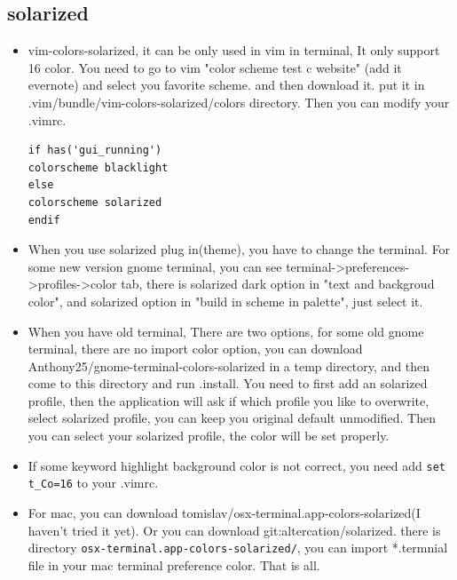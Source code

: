 \documentclass[a4paper,12pt,twoside]{book}
\begin{document}
\subsection{solarized}
\begin{itemize}
	\item vim-colors-solarized, it can be only used in vim in terminal, It only support 16 color. You need to go to  vim "color scheme test c website" (add it evernote) and select you favorite scheme. and then download it. put it in .vim/bundle/vim-colors-solarized/colors directory. Then you can modify your .vimrc.
	
\begin{verbatim}
if has('gui_running')
colorscheme blacklight
else
colorscheme solarized
endif 
\end{verbatim}
	\item When you use solarized plug in(theme), you have to change the terminal. For some new version gnome terminal, you can see terminal->preferences->profiles->color tab, there is solarized dark option in "text and backgroud color", and solarized option in "build in scheme in palette", just select it.

    \item When you have old terminal, There are two options, for some old gnome
        terminal, there are no import color option, you can download
        Anthony25/gnome-terminal-colors-solarized in a temp directory, and then
        come to this directory and run .install. You need to first add an solarized profile, then the application will ask if which profile you like to overwrite, select solarized profile, you can keep you original default unmodified. Then you can select your solarized profile, the color will be set properly. 

\item If some keyword highlight background color is not correct, you need add \verb!set t_Co=16! to your .vimrc. 
    \item For mac, you can download
        tomislav/osx-terminal.app-colors-solarized(I haven't tried it yet). Or
        you can download git:altercation/solarized. there is directory \verb!osx-terminal.app-colors-solarized/!, you can import *.termnial file in
        your mac terminal preference color. That is all.
\end{itemize}
\end{document}
